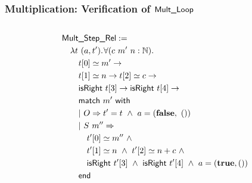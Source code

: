 \documentclass{beamer} %
\renewcommand{\eqsim}{\simeq}
\renewcommand{\Nat}{\mathbb{N}}
\begin{document}
\begin{frame}
  \frametitle{Multiplication: Verification of $\textsf{Mult\_Loop}$}
  \tiny

  \begin{columns}
    \begin{column}{0.5\textwidth}
      \begin{align*}
        & \MS{Mult\_Step\_Rel} := \\
        &\quad \lam{t~(a, t')} \forall (c~m'~n:\Nat). \\
        &\quad\quad t[0] \eqsim m' \rightarrow \\
        &\quad\quad t[1] \eqsim n \rightarrow t[2] \eqsim c \rightarrow \\
        &\quad\quad \MS{isRight}~t[3] \rightarrow \MS{isRight}~t[4] \rightarrow \\
        &\quad\quad \MS{match}~m'~\MS{with} \\
        &\quad\quad |~O \Rightarrow t' = t ~\land~ a = (\false,\ \unit) \\
        &\quad\quad |~S~m'' \Rightarrow \\
        &\quad\quad\quad t'[0] \eqsim m'' ~\land \\
        &\quad\quad\quad t'[1] \eqsim n ~\land~ t'[2] \eqsim n+c ~\land \\
        &\quad\quad\quad \MS{isRight}~t'[3] ~\land~ \MS{isRight}~t'[4] ~\land~ a = (\true, \unit) \\
        &\quad\quad \MS{end}
      \end{align*}
    \end{column}


\end{columns}
\end{frame}
\end{document}
